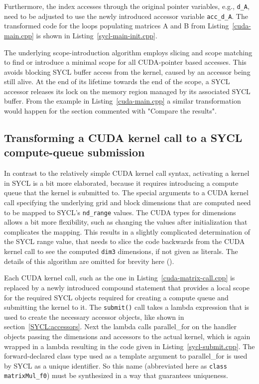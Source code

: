 \documentclass[sigconf]{acmart}
\newcommand{\inputcode}[2]{}
\newcommand{\inputsycl}[2]{}
\newcommand{\tcode}[1]{\texttt{#1}}
\begin{document}
Furthermore, the index accesses through the original pointer variables, e.g., \tcode{d_A}, need to be adjusted to use the newly introduced accessor variable \tcode{acc_d_A}. The transformed code for the loops populating matrices A and B from Listing~\ref{cuda-main.cpp} is shown in Listing~\ref{sycl-main-init.cpp}.
\inputsycl{sycl-main-init.cpp}{Introducing scope for SYCL accessors}


The underlying scope-introduction algorithm employs slicing and scope matching to find or introduce a minimal scope for all CUDA-pointer based accesses. This avoids blocking SYCL buffer access from the kernel, caused by an accessor being still alive. At the end of its lifetime towards the end of the scope, a SYCL accessor releases its lock on the memory region managed by its associated SYCL buffer. From the example in Listing~\ref{cuda-main.cpp} a similar transformation would happen for the section commented with "Compare the results".

\subsection{Transforming a CUDA kernel call to a SYCL compute-queue submission} 

In contrast to the relatively simple CUDA kernel call syntax, activating a kernel in SYCL is a bit more elaborated, because it requires introducing a compute queue that the kernel is submitted to. The special arguments to a CUDA kernel call specifying the underlying grid and block dimensions that are computed need to be mapped to SYCL's \tcode{nd_range} values. The CUDA types for dimensions allows a bit more flexibility, such as changing the values after initialization that complicates the mapping. This results in a slightly complicated determination of the SYCL range value, that needs to slice the code backwards from the CUDA kernel call to see the computed \tcode{dim3} dimensions, if not given as literals. The details of this algorithm are omitted for brevity here (\cite{stauberCUDASYCL2018}).

Each CUDA kernel call, such as the one in Listing~\ref{cuda-matrix-call.cpp} is replaced by a newly introduced compound statement that provides a local scope for the required SYCL objects required for creating a compute queue and submitting the kernel to it. 
The \tcode{submit()} call takes a lambda expression that is used to create the necessary accessor objects, like shown in section~\ref{SYCL:accessors}. Next the lambda calls parallel_for on the handler objects passing the dimensions and accessors to the actual kernel, which is again wrapped in a lambda resulting in the code given in Listing~\ref{sycl-submit.cpp}. The forward-declared class type used as a template argument to parallel_for is used by SYCL as a unique identifier. So this name (abbreviated here as \tcode{class matrixMul_f0}) must be synthesized in a way that guarantees uniqueness. 
\inputcode{cuda-matrix-call.cpp}{Kernel call to be transformed}
\inputsycl{sycl-submit.cpp}{Submitting transformed kernel}
\end{document}
